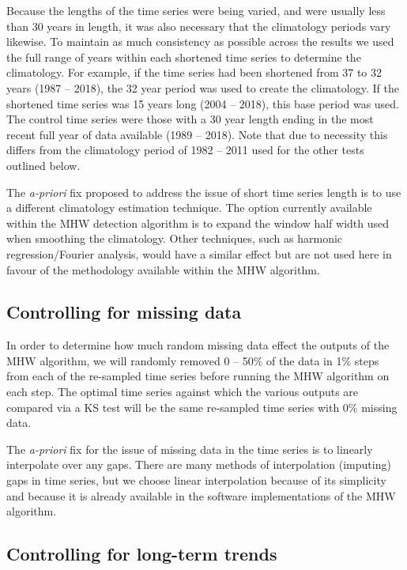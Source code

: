 \documentclass[utf8]{frontiersSCNS} %
\begin{document}
Because the lengths of the time series were being varied, and were
usually less than 30 years in length, it was also necessary that the
climatology periods vary likewise. To maintain as much consistency as
possible across the results we used the full range of years within each
shortened time series to determine the climatology. For example, if the
time series had been shortened from 37 to 32 years (1987 -- 2018), the
32 year period was used to create the climatology. If the shortened time
series was 15 years long (2004 -- 2018), this base period was used. The
control time series were those with a 30 year length ending in the most
recent full year of data available (1989 -- 2018). Note that due to
necessity this differs from the climatology period of 1982 -- 2011 used
for the other tests outlined below.

The \emph{a-priori} fix proposed to address the issue of short time
series length is to use a different climatology estimation technique.
The option currently available within the MHW detection algorithm is to
expand the window half width used when smoothing the climatology. Other
techniques, such as harmonic regression/Fourier analysis, would have a
similar effect but are not used here in favour of the methodology
available within the MHW algorithm.

\hypertarget{controlling-for-missing-data}{%
\subsection{Controlling for missing
data}\label{controlling-for-missing-data}}

In order to determine how much random missing data effect the outputs of
the MHW algorithm, we will randomly removed 0 -- 50\% of the data in 1\%
steps from each of the re-sampled time series before running the MHW
algorithm on each step. The optimal time series against which the
various outputs are compared via a KS test will be the same re-sampled
time series with 0\% missing data.

The \emph{a-priori} fix for the issue of missing data in the time series
is to linearly interpolate over any gaps. There are many methods of
interpolation (imputing) gaps in time series, but we choose linear
interpolation because of its simplicity and because it is already
available in the software implementations of the MHW algorithm.

\hypertarget{controlling-for-long-term-trends}{%
\subsection{Controlling for long-term
trends}\label{controlling-for-long-term-trends}}
\end{document}
